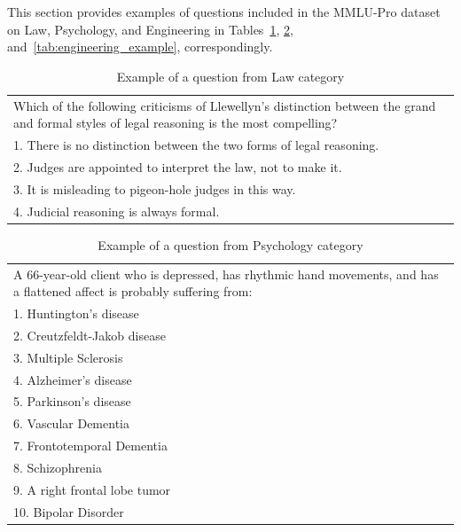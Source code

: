 This section provides examples of questions included in the MMLU-Pro dataset on Law, Psychology, and Engineering in Tables~\ref{tab:law_example}, \ref{tab:psychology_example}, and~\ref{tab:engineering_example}, correspondingly. 

\begin{table}[H]
    \small
    \centering
    \caption{Example of a question from Law category}
    \label{tab:law_example}
    \begin{tabular}{p{11cm}}
    \hline
    Which of the following criticisms of Llewellyn's distinction between the grand and formal styles of legal reasoning is the most compelling? \\
    1. There is no distinction between the two forms of legal reasoning. \\
    2. Judges are appointed to interpret the law, not to make it. \\
    3. It is misleading to pigeon-hole judges in this way. \\
    4. Judicial reasoning is always formal. \\
    \hline
    \end{tabular}
\end{table}

\begin{table}[H]
    \small
    \centering
    \caption{Example of a question from Psychology category}
    \label{tab:psychology_example}
    \begin{tabular}{p{11cm}}
    \hline
    A 66-year-old client who is depressed, has rhythmic hand movements, and has a flattened affect is probably suffering from: \\
    1. Huntington's disease \\
    2. Creutzfeldt-Jakob disease \\
    3. Multiple Sclerosis \\
    4. Alzheimer's disease \\
    5. Parkinson's disease \\
    6. Vascular Dementia \\
    7. Frontotemporal Dementia \\
    8. Schizophrenia \\
    9. A right frontal lobe tumor \\
    10. Bipolar Disorder \\
    \hline
    \end{tabular}
\end{table}

